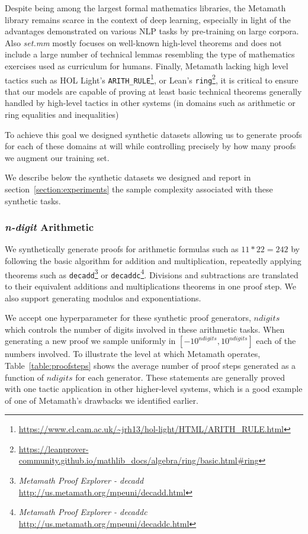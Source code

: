 \documentclass{article}
\begin{document}
Despite being among the largest formal mathematics libraries, the Metamath library remains scarce in the context of deep learning, especially in light of the advantages demonstrated on various NLP tasks by pre-training on large corpora. Also \textit{set.mm} mostly focuses on well-known high-level theorems and does not include a large number of technical lemmas resembling the type of mathematics exercises used as curriculum for humans. Finally, Metamath lacking high level tactics such as HOL Light's \verb|ARITH_RULE|\footnote{\url{https://www.cl.cam.ac.uk/~jrh13/hol-light/HTML/ARITH_RULE.html}}, or Lean's \verb|ring|\footnote{\url{https://leanprover-community.github.io/mathlib_docs/algebra/ring/basic.html\#ring}}, it is critical to ensure that our models are capable of proving at least basic technical theorems generally handled by high-level tactics in other systems (in domains such as arithmetic or ring equalities and inequalities)

To achieve this goal we designed synthetic datasets allowing us to generate proofs for each of these domains at will while controlling precisely by how many proofs we augment our training set.

We describe below the synthetic datasets we designed and report in section~\ref{section:experiments} the sample complexity associated with these synthetic tasks.

\subsubsection{\textit{n-digit} Arithmetic}

We synthetically generate proofs for arithmetic formulas such as $11*22=242$ by following the basic algorithm for addition and multiplication, repeatedly applying theorems such as \verb|decadd|\footnote{\textit{Metamath Proof Explorer - decadd} \url{http://us.metamath.org/mpeuni/decadd.html}} or \verb|decaddc|\footnote{\textit{Metamath Proof Explorer - decaddc} \url{http://us.metamath.org/mpeuni/decaddc.html}}. Divisions and subtractions are translated to their equivalent additions and multiplications theorems in one proof step. We also support generating modulos and exponentiations.

We accept one hyperparameter for these synthetic proof generators, $\mathit{ndigits}$ which controls the number of digits involved in these arithmetic tasks. When generating a new proof we sample uniformly in $[-10^{\mathit{ndigits}}, 10^{\mathit{ndigits}}]$ each of the numbers involved. To illustrate the level at which Metamath operates, Table~\ref{table:proofsteps} shows the average number of proof steps generated as a function of $\mathit{ndigits}$ for each generator. These statements are generally proved with one tactic application in other higher-level systems, which is a good example of one of Metamath's drawbacks we identified earlier.
\end{document}
